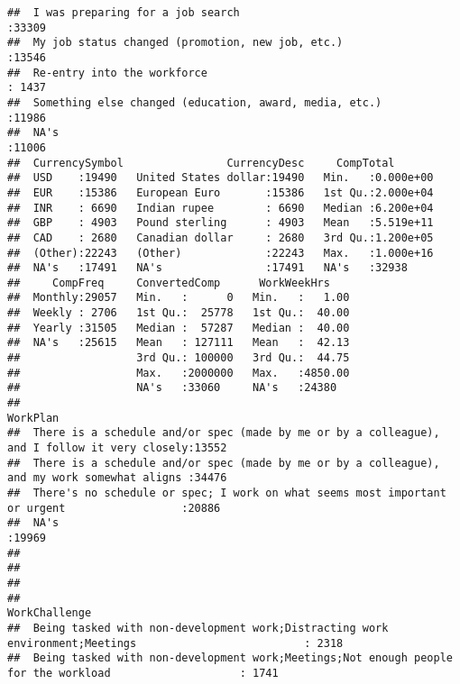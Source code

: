 \documentclass[]{article}
\begin{document}
\begin{verbatim}
##  I was preparing for a job search                                            :33309  
##  My job status changed (promotion, new job, etc.)                            :13546  
##  Re-entry into the workforce                                                 : 1437  
##  Something else changed (education, award, media, etc.)                      :11986  
##  NA's                                                                        :11006  
##  CurrencySymbol                CurrencyDesc     CompTotal        
##  USD    :19490   United States dollar:19490   Min.   :0.000e+00  
##  EUR    :15386   European Euro       :15386   1st Qu.:2.000e+04  
##  INR    : 6690   Indian rupee        : 6690   Median :6.200e+04  
##  GBP    : 4903   Pound sterling      : 4903   Mean   :5.519e+11  
##  CAD    : 2680   Canadian dollar     : 2680   3rd Qu.:1.200e+05  
##  (Other):22243   (Other)             :22243   Max.   :1.000e+16  
##  NA's   :17491   NA's                :17491   NA's   :32938      
##     CompFreq     ConvertedComp      WorkWeekHrs     
##  Monthly:29057   Min.   :      0   Min.   :   1.00  
##  Weekly : 2706   1st Qu.:  25778   1st Qu.:  40.00  
##  Yearly :31505   Median :  57287   Median :  40.00  
##  NA's   :25615   Mean   : 127111   Mean   :  42.13  
##                  3rd Qu.: 100000   3rd Qu.:  44.75  
##                  Max.   :2000000   Max.   :4850.00  
##                  NA's   :33060     NA's   :24380    
##                                                                                          WorkPlan    
##  There is a schedule and/or spec (made by me or by a colleague), and I follow it very closely:13552  
##  There is a schedule and/or spec (made by me or by a colleague), and my work somewhat aligns :34476  
##  There's no schedule or spec; I work on what seems most important or urgent                  :20886  
##  NA's                                                                                        :19969  
##                                                                                                      
##                                                                                                      
##                                                                                                      
##                                                                                                 WorkChallenge  
##  Being tasked with non-development work;Distracting work environment;Meetings                          : 2318  
##  Being tasked with non-development work;Meetings;Not enough people for the workload                    : 1741  

\end{verbatim}
\end{document}
